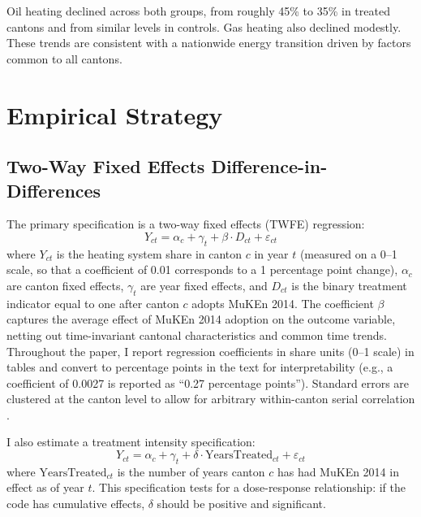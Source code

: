 \documentclass[12pt]{article}
\begin{document}
Oil heating declined across both groups, from roughly 45\% to 35\% in treated cantons and from similar levels in controls. Gas heating also declined modestly. These trends are consistent with a nationwide energy transition driven by factors common to all cantons.




\section{Empirical Strategy}

\subsection{Two-Way Fixed Effects Difference-in-Differences}

The primary specification is a two-way fixed effects (TWFE) regression:
\begin{equation}
    Y_{ct} = \alpha_c + \gamma_t + \beta \cdot D_{ct} + \varepsilon_{ct}
    \label{eq:twfe}
\end{equation}
where $Y_{ct}$ is the heating system share in canton $c$ in year $t$ (measured on a 0--1 scale, so that a coefficient of 0.01 corresponds to a 1 percentage point change), $\alpha_c$ are canton fixed effects, $\gamma_t$ are year fixed effects, and $D_{ct}$ is the binary treatment indicator equal to one after canton $c$ adopts MuKEn 2014. The coefficient $\beta$ captures the average effect of MuKEn 2014 adoption on the outcome variable, netting out time-invariant cantonal characteristics and common time trends. Throughout the paper, I report regression coefficients in share units (0--1 scale) in tables and convert to percentage points in the text for interpretability (e.g., a coefficient of 0.0027 is reported as ``0.27 percentage points''). Standard errors are clustered at the canton level to allow for arbitrary within-canton serial correlation \citep{cameron2008bootstrap}.

I also estimate a treatment intensity specification:
\begin{equation}
    Y_{ct} = \alpha_c + \gamma_t + \delta \cdot \text{YearsTreated}_{ct} + \varepsilon_{ct}
    \label{eq:intensity}
\end{equation}
where $\text{YearsTreated}_{ct}$ is the number of years canton $c$ has had MuKEn 2014 in effect as of year $t$. This specification tests for a dose-response relationship: if the code has cumulative effects, $\delta$ should be positive and significant.
\end{document}
